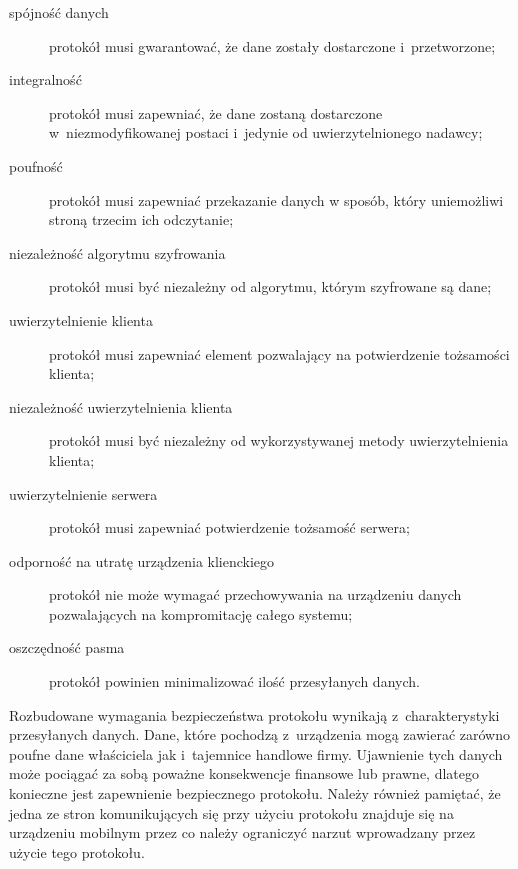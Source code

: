 \begin{description}
\item[spójność danych] protokół musi gwarantować, że dane zostały
  dostarczone i~przetworzone;
\item[integralność] protokół musi zapewniać, że dane zostaną
  dostarczone w~niezmodyfikowanej postaci i~jedynie od
  uwierzytelnionego nadawcy;
\item[poufność] protokół musi zapewniać przekazanie danych w sposób,
  który uniemożliwi stroną trzecim ich odczytanie;
\item[niezależność algorytmu szyfrowania] protokół musi być niezależny
  od algorytmu, którym szyfrowane są dane;
\item[uwierzytelnienie klienta] protokół musi zapewniać element
  pozwalający na potwierdzenie tożsamości klienta;
\item[niezależność uwierzytelnienia klienta] protokół musi być
  niezależny od wykorzystywanej metody uwierzytelnienia klienta;
\item[uwierzytelnienie serwera] protokół musi zapewniać potwierdzenie
  tożsamość serwera;
\item[odporność na utratę urządzenia klienckiego] protokół nie może
  wymagać przechowywania na urządzeniu danych pozwalających na
  kompromitację całego systemu;
\item[oszczędność pasma] protokół powinien minimalizować ilość
  przesyłanych danych.
\end{description}

Rozbudowane wymagania bezpieczeństwa protokołu wynikają
z~charakterystyki przesyłanych danych. Dane, które pochodzą
z~urządzenia mogą zawierać zarówno poufne dane właściciela jak
i~tajemnice handlowe firmy. Ujawnienie tych danych może pociągać za
sobą poważne konsekwencje finansowe lub prawne, dlatego konieczne jest
zapewnienie bezpiecznego protokołu. Należy również pamiętać, że jedna
ze stron komunikujących się przy użyciu protokołu znajduje się na
urządzeniu mobilnym przez co należy ograniczyć narzut wprowadzany
przez użycie tego protokołu.

